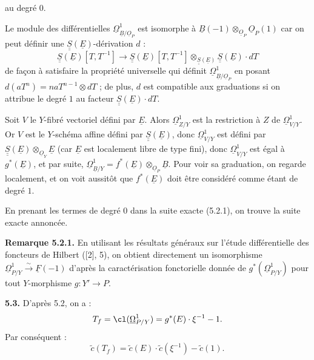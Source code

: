 
au degré \(0\).

Le module des différentielles \(\underline{\Omega}^1_{\underline{B}/\underline{O}_P}\) est isomorphe à \(\underline{B}(-1)\otimes_{\underline{O}_P}\underline{O}_P(1)\) car on peut définir une \(\underline{\underline{S}}(\underline{E})\)-dérivation \(d\) :
\[
\underline{\underline{S}}(\underline{E})[T,T^{-1}]
\longrightarrow
\underline{\underline{S}}(\underline{E})[T,T^{-1}]\otimes_{\underline{\underline{S}}(\underline{E})}\underline{\underline{S}}(\underline{E})\cdot dT
\]
de façon à satisfaire la propriété universelle qui définit \(\underline{\Omega}^1_{\underline{B}/\underline{O}_P}\) en posant \(d(aT^n)=naT^{n-1}\otimes dT\) ; de plus, \(d\) est compatible aux graduations si on attribue le degré \(1\) au facteur \(\underline{\underline{S}}(\underline{E})\cdot dT\).

Soit \(V\) le \(Y\)-fibré vectoriel défini par \(\underline{E}\). Alors \(\underline{\Omega}^1_{Z/Y}\) est la restriction à \(Z\) de \(\underline{\Omega}^1_{V/Y}\). Or \(V\) est le \(Y\)-schéma affine défini par \(\underline{\underline{S}}(\underline{E})\), donc \(\underline{\Omega}^1_{V/Y}\) est défini par \(\underline{\underline{S}}(\underline{E})\otimes_{\underline{O}_Y}\underline{E}\) (car \(\underline{E}\) est localement libre de type fini), donc \(\underline{\Omega}^1_{V/Y}\) est égal à \(g^*(\underline{E})\), et par suite, \(\underline{\Omega}^1_{\underline{B}/Y}=f^*(\underline{E})\otimes_{\underline{O}_P}\underline{B}\). Pour voir sa graduation, on regarde localement, et on voit aussitôt que \(f^*(\underline{E})\) doit être considéré comme étant de degré \(1\).

En prenant les termes de degré \(0\) dans la suite exacte (5.2.1), on trouve la suite exacte annoncée.

\textbf{Remarque 5.2.1.} En utilisant les résultats généraux sur l'étude différentielle des foncteurs de Hilbert ([2], 5), on obtient directement un isomorphisme \(\underline{\Omega}^1_{P/Y}\xrightarrow{\sim}\underline{F}(-1)\) d'après la caractérisation fonctorielle donnée de \(g^*(\underline{\Omega}^1_{P/Y})\) pour tout \(Y\)-morphisme \(g:Y'\to P\).

\textbf{5.3.} D'après 5.2, on a :
\[
 T_f=\cl(\underline{\Omega}^1_{P/Y})=g^*(E)\cdot\xi^{-1}-1.
\]
Par conséquent :
\[
 \widetilde c(T_f)=\widetilde c(E)\cdot\widetilde c(\xi^{-1})-\widetilde c(1).
\]

